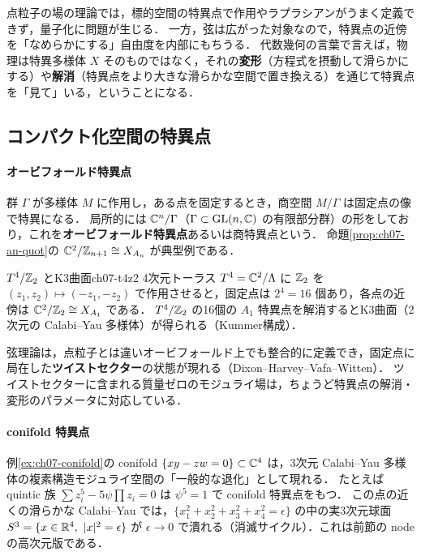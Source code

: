 点粒子の場の理論では，標的空間の特異点で作用やラプラシアンがうまく定義できず，量子化に問題が生じる．
一方，弦は広がった対象なので，特異点の近傍を「なめらかにする」自由度を内部にもちうる．
代数幾何の言葉で言えば，物理は特異多様体 $X$ そのものではなく，それの\textbf{変形}（方程式を摂動して滑らかにする）や\textbf{解消}（特異点をより大きな滑らかな空間で置き換える）を通じて特異点を「見て」いる，ということになる．

\subsection{コンパクト化空間の特異点}

\paragraph{オービフォールド特異点}
群 $\Gamma$ が多様体 $M$ に作用し，ある点を固定するとき，商空間 $M/\Gamma$ は固定点の像で特異になる．
局所的には $\mathbb{C}^n/\Gamma$（$\Gamma\subset\operatorname{GL}(n,\mathbb{C})$ の有限部分群）の形をしており，これを\textbf{オービフォールド特異点}あるいは商特異点という．
命題\ref{prop:ch07-an-quot}の $\mathbb{C}^2/\mathbb{Z}_{n+1}\cong X_{A_n}$ が典型例である．

\begin{myex}{$T^4/\mathbb{Z}_2$ とK3曲面}{ch07-t4z2}
4次元トーラス $T^4=\mathbb{C}^2/\Lambda$ に $\mathbb{Z}_2$ を $(z_1,z_2)\mapsto(-z_1,-z_2)$ で作用させると，固定点は $2^4=16$ 個あり，各点の近傍は $\mathbb{C}^2/\mathbb{Z}_2\cong X_{A_1}$ である．
$T^4/\mathbb{Z}_2$ の16個の $A_1$ 特異点を解消するとK3曲面（2次元の Calabi–Yau 多様体）が得られる（Kummer構成）．
\end{myex}

弦理論は，点粒子とは違いオービフォールド上でも整合的に定義でき，固定点に局在した\textbf{ツイストセクター}の状態が現れる（Dixon–Harvey–Vafa–Witten）．
ツイストセクターに含まれる質量ゼロのモジュライ場は，ちょうど特異点の解消・変形のパラメータに対応している．

\paragraph{conifold 特異点}
例\ref{ex:ch07-conifold}の conifold $\{xy-zw=0\}\subset\mathbb{C}^4$ は，3次元 Calabi–Yau 多様体の複素構造モジュライ空間の「一般的な退化」として現れる．
たとえば quintic 族 $\sum z_i^5-5\psi\prod z_i=0$ は $\psi^5=1$ で conifold 特異点をもつ．
この点の近くの滑らかな Calabi–Yau では，$\{x_1^2+x_2^2+x_3^2+x_4^2=\epsilon\}$ の中の実3次元球面 $S^3=\{x\in\R^4,\ |x|^2=\epsilon\}$ が $\epsilon\to0$ で潰れる（消滅サイクル）．これは前節の node の高次元版である．

